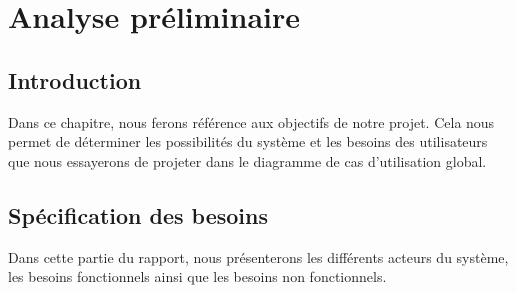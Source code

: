 \chapter{Analyse préliminaire}

\section*{Introduction}
Dans ce chapitre, nous ferons référence aux objectifs de notre projet. Cela nous permet de déterminer les possibilités du système et les besoins des utilisateurs que nous essayerons de projeter dans le diagramme de cas d'utilisation global.
    
\section{Spécification des besoins}
Dans cette partie du rapport, nous présenterons les différents acteurs du système, les besoins fonctionnels ainsi que les besoins non fonctionnels.
